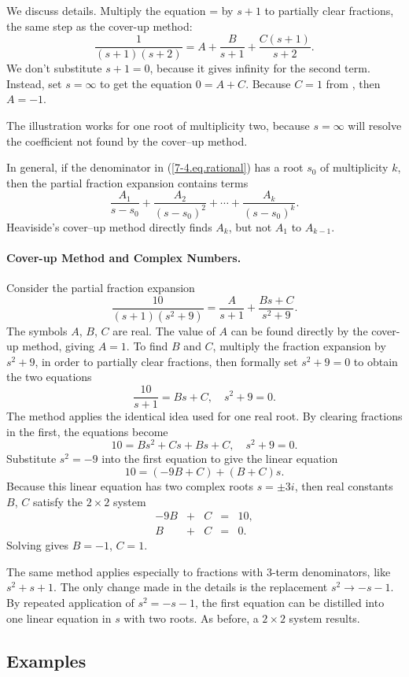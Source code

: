 \documentclass{article}
\def\rf#1{(\ref{#1})}
\def\Paragraph#1{\paragraph{#1.}}
\begin{document}
We discuss  details. Multiply the equation  =
 by $s+1$ to partially clear fractions, the same step as
the cover-up method:
$$
 \frac{1}{(s+1)(s+2)}=A+\frac{B}{s+1}+\frac{C(s+1)}{s+2}.
$$
We don't substitute $s+1=0$, because it gives infinity for the
second term. Instead, set $s=\infty$ to get the equation $0=A+C$.
Because $C=1$ from , then $A=-1$.

The illustration works for one root of multiplicity two, because
$s=\infty$ will resolve the coefficient not found by the cover--up
method.

In general, if the denominator in \rf{7-4.eq.rational} has a root $s_0$
of multiplicity $k$, then the partial fraction expansion contains terms
$$\frac{A_1}{s-s_0}+ \frac{A_2}{(s-s_0)^2}+ \cdots +
\frac{A_k}{(s-s_0)^k}.$$
Heaviside's cover--up method directly finds $A_k$, but not $A_1$ to
$A_{k-1}$.

\Paragraph{Cover-up Method and Complex Numbers} Consider the
partial fraction expansion
$$
 \frac{10}{(s+1)(s^2+9)}=\frac{A}{s+1}+\frac{Bs+C}{s^2+9}.
$$
The symbols $A$, $B$, $C$ are real. The value of $A$ can be found
directly by the cover-up method, giving $A=1$. To find $B$ and
$C$, multiply the fraction expansion by $s^2+9$, in order to
partially clear fractions, then formally set $s^2+9=0$ to obtain
the two equations
$$
 \frac{10}{s+1}=Bs+C,\quad s^2+9=0.
$$
The method applies the identical idea used for one real root. By
clearing fractions in the first, the equations become
$$
 10=Bs^2+Cs+Bs+C,\quad s^2+9=0.
$$
Substitute $s^2=-9$ into the first equation to give the linear
equation
$$
 10=(-9B+C)+(B+C)s.
$$
Because this linear equation has two complex roots $s=\pm 3i$,
then real constants $B$, $C$ satisfy the $2\times 2$ system
$$
 \begin{array}{rcrcr}
 -9B&+&C &=& 10, \\
   B&+&C &=& 0.
 \end{array}
$$
Solving gives $B=-1$, $C=1$.

The same method applies especially to fractions with $3$-term
denominators, like $s^2+s+1$. The only change made in the details
is the replacement $s^2\to -s-1$. By repeated application of
$s^2=-s-1$, the first equation can be distilled into one linear
equation in $s$ with two roots. As before, a $2\times 2$ system
results.

\subsection{Examples}
\end{document}
